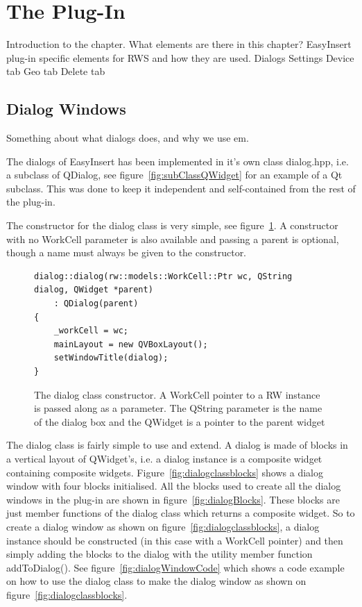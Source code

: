 \section{The Plug-In}
Introduction to the chapter.
	What elements are there in this chapter?		
		EasyInsert
			plug-in specific elements for RWS and how they are used.
		Dialogs
		Settings		
		Device tab
		Geo tab
		Delete tab


\subsection{Dialog Windows}
Something about what dialogs does, and why we use em.

The dialogs of EasyInsert has been implemented in it's own class dialog.hpp, i.e. a subclass of QDialog, see figure~\ref{fig:subClassQWidget} for an example of a Qt subclass. This was done to keep it independent and self-contained from the rest of the plug-in. 

The constructor for the dialog class is very simple, see figure~\ref{fig:dialogConstructor}. A constructor with no WorkCell parameter is also available and passing a parent is optional, though a name must always be given to the constructor. 

\begin{figure}[h]
\centering
\lstset{language=C++} 
\begin{lstlisting}[frame=single]  
dialog::dialog(rw::models::WorkCell::Ptr wc, QString dialog, QWidget *parent)
    : QDialog(parent)
{
    _workCell = wc;
    mainLayout = new QVBoxLayout();
    setWindowTitle(dialog);
}			 
\end{lstlisting}
\caption{The dialog class constructor. A WorkCell pointer to a RW instance is passed along as a parameter. The QString parameter is the name of the dialog box and the QWidget is a pointer to the parent widget }
\label{fig:dialogConstructor} 	
\end{figure}

The dialog class is fairly simple to use and extend. A dialog is made of blocks in a vertical layout of QWidget's, i.e. a dialog instance is a composite widget containing composite widgets. Figure~\ref{fig:dialogclassblocks} shows a dialog window with four blocks initialised. All the blocks used to create all the dialog windows in the plug-in are shown in figure~\ref{fig:dialogBlocks}. These blocks are just member functions of the dialog class which returns a composite widget. So to create a dialog window as shown on figure~\ref{fig:dialogclassblocks}, a dialog instance should be constructed (in this case with a WorkCell pointer) and then simply adding the blocks to the dialog with the utility member function addToDialog(). See figure~\ref{fig:dialogWindowCode} which shows a code example on how to use the dialog class to make the dialog window as shown on figure~\ref{fig:dialogclassblocks}. 

